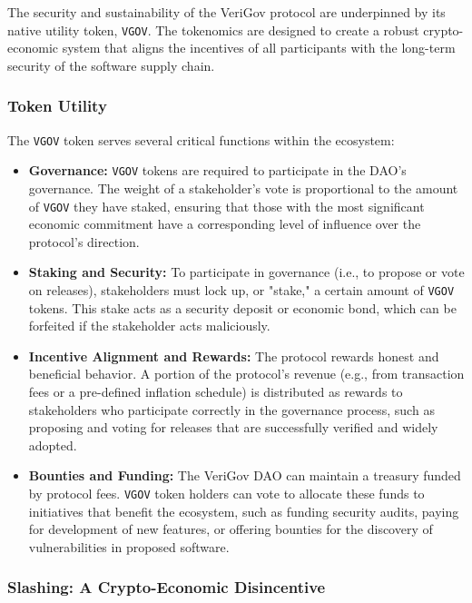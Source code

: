 \documentclass{article}
\begin{document}
The security and sustainability of the VeriGov protocol are underpinned by its native utility token, \lstinline{VGOV}. The tokenomics are designed to create a robust crypto-economic system that aligns the incentives of all participants with the long-term security of the software supply chain.~\cite{saleh2021blockchain}

\subsubsection{Token Utility}

The \lstinline{VGOV} token serves several critical functions within the ecosystem:

\begin{itemize}
\item \textbf{Governance:} \lstinline{VGOV} tokens are required to participate in the DAO's governance. The weight of a stakeholder's vote is proportional to the amount of \lstinline{VGOV} they have staked, ensuring that those with the most significant economic commitment have a corresponding level of influence over the protocol's direction.~\cite{lalley2018qv}
\item \textbf{Staking and Security:} To participate in governance (i.e., to propose or vote on releases), stakeholders must lock up, or "stake," a certain amount of \lstinline{VGOV} tokens. This stake acts as a security deposit or economic bond, which can be forfeited if the stakeholder acts maliciously.~\cite{buterin2017casper}
\item \textbf{Incentive Alignment and Rewards:} The protocol rewards honest and beneficial behavior. A portion of the protocol's revenue (e.g., from transaction fees or a pre-defined inflation schedule) is distributed as rewards to stakeholders who participate correctly in the governance process, such as proposing and voting for releases that are successfully verified and widely adopted.~\cite{buterin2017casper}
\item \textbf{Bounties and Funding:} The VeriGov DAO can maintain a treasury funded by protocol fees. \lstinline{VGOV} token holders can vote to allocate these funds to initiatives that benefit the ecosystem, such as funding security audits, paying for development of new features, or offering bounties for the discovery of vulnerabilities in proposed software.~\cite{dupont2017dao}
\end{itemize}

\subsubsection{Slashing: A Crypto-Economic Disincentive}
\end{document}
